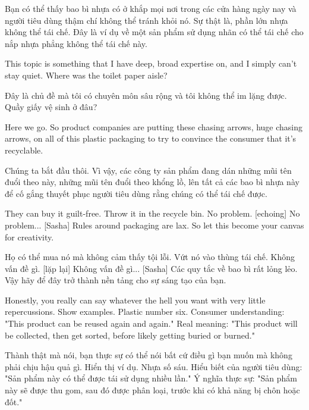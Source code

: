 \documentclass[a4paper]{article}
\begin{document}
	\begin{vietnamese-v2}
		Bạn có thể thấy bao bì nhựa có ở khắp mọi nơi trong các cửa hàng ngày nay và người tiêu dùng thậm chí không thể tránh khỏi nó.
		Sự thật là, phần lớn nhựa không thể tái chế.
		Đây là ví dụ về một sản phẩm sử dụng nhãn có thể tái chế cho nắp nhựa phẳng không thể tái chế này.
	\end{vietnamese-v2}

	This topic is something that I have deep, broad expertise on, and I simply can't stay quiet.
	Where was the toilet paper aisle?
	
	\begin{vietnamese-v2}
		Đây là chủ đề mà tôi có chuyên môn sâu rộng và tôi không thể im lặng được.
		Quầy giấy vệ sinh ở đâu?
	\end{vietnamese-v2}
	
	Here we go.
	So product companies are putting these chasing arrows, huge chasing arrows, on all of this plastic packaging to try to convince the consumer that it's recyclable.
	
	\begin{vietnamese-v2}
		Chúng ta bắt đầu thôi.
		Vì vậy, các công ty sản phẩm đang dán những mũi tên đuổi theo này, những mũi tên đuổi theo khổng lồ, lên tất cả các bao bì nhựa này để cố gắng thuyết phục người tiêu dùng rằng chúng có thể tái chế được.
	\end{vietnamese-v2}
	
	They can buy it guilt-free.
	Throw it in the recycle bin.
	No problem.
	[echoing] No problem...
	[Sasha] Rules around packaging are lax.
	So let this become your canvas for creativity.
	
	\begin{vietnamese-v2}
		Họ có thể mua nó mà không cảm thấy tội lỗi.
		Vứt nó vào thùng tái chế.
		Không vấn đề gì.
		[lặp lại] Không vấn đề gì...
		[Sasha] Các quy tắc về bao bì rất lỏng lẻo.
		Vậy hãy để đây trở thành nền tảng cho sự sáng tạo của bạn.
	\end{vietnamese-v2}
	
	Honestly, you really can say whatever the hell you want with very little repercussions.
	Show examples.
	Plastic number six.
	Consumer understanding:
	"This product can be reused again and again." Real meaning: "This product will be collected, then get sorted, before likely getting buried or burned."
	
	\begin{vietnamese-v2}
		Thành thật mà nói, bạn thực sự có thể nói bất cứ điều gì bạn muốn mà không phải chịu hậu quả gì.
		Hiển thị ví dụ.
		Nhựa số sáu.
		Hiểu biết của người tiêu dùng:
		"Sản phẩm này có thể được tái sử dụng nhiều lần." Ý nghĩa thực sự: "Sản phẩm này sẽ được thu gom, sau đó được phân loại, trước khi có khả năng bị chôn hoặc đốt."
	\end{vietnamese-v2}
	
\end{document}
